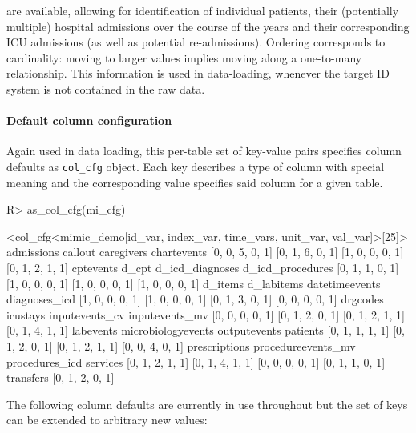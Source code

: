 \documentclass[
  notitle]{jss}
\begin{document}
are available, allowing for identification of individual patients, their
(potentially multiple) hospital admissions over the course of the years
and their corresponding ICU admissions (as well as potential
re-admissions). Ordering corresponds to cardinality: moving to larger
values implies moving along a one-to-many relationship. This information
is used in data-loading, whenever the target ID system is not contained
in the raw data.

\hypertarget{default-column-configuration}{%
\paragraph{Default column
configuration}\label{default-column-configuration}}

Again used in data loading, this per-table set of key-value pairs
specifies column defaults as \texttt{col\_cfg} object. Each key
describes a type of column with special meaning and the corresponding
value specifies said column for a given table.

\begin{CodeChunk}
\begin{CodeInput}
R> as_col_cfg(mi_cfg)
\end{CodeInput}
\begin{CodeOutput}
<col_cfg<mimic_demo[id_var, index_var, time_vars, unit_var, val_var]>[25]>
        admissions            callout         caregivers        chartevents 
   [0, 0, 5, 0, 1]    [0, 1, 6, 0, 1]    [1, 0, 0, 0, 1]    [0, 1, 2, 1, 1] 
         cptevents              d_cpt    d_icd_diagnoses   d_icd_procedures 
   [0, 1, 1, 0, 1]    [1, 0, 0, 0, 1]    [1, 0, 0, 0, 1]    [1, 0, 0, 0, 1] 
           d_items         d_labitems     datetimeevents      diagnoses_icd 
   [1, 0, 0, 0, 1]    [1, 0, 0, 0, 1]    [0, 1, 3, 0, 1]    [0, 0, 0, 0, 1] 
          drgcodes           icustays     inputevents_cv     inputevents_mv 
   [0, 0, 0, 0, 1]    [0, 1, 2, 0, 1]    [0, 1, 2, 1, 1]    [0, 1, 4, 1, 1] 
         labevents microbiologyevents       outputevents           patients 
   [0, 1, 1, 1, 1]    [0, 1, 2, 0, 1]    [0, 1, 2, 1, 1]    [0, 0, 4, 0, 1] 
     prescriptions procedureevents_mv     procedures_icd           services 
   [0, 1, 2, 1, 1]    [0, 1, 4, 1, 1]    [0, 0, 0, 0, 1]    [0, 1, 1, 0, 1] 
         transfers 
   [0, 1, 2, 0, 1] 
\end{CodeOutput}
\end{CodeChunk}

The following column defaults are currently in use throughout 
but the set of keys can be extended to arbitrary new values:
\end{document}
